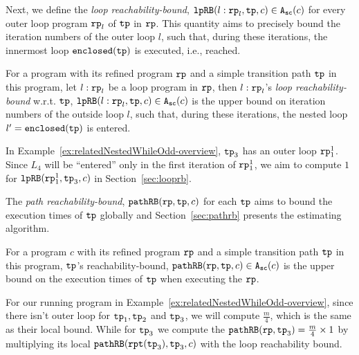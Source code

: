 Next, we define the \emph{loop reachability-bound},
$\mathtt{lpRB}(l: \mathtt{rp}_l, \mathtt{tp}, c) \in {\ensuremath{\mathtt{A_{sc}}}}(c)$ for every outer loop program $\mathtt{rp}_l$ of $\mathtt{tp}$ in $\mathtt{rp}$. This quantity aims to precisely bound the iteration numbers of the outer loop $l$,
such that,
during these iterations, the innermost loop $\mathtt{enclosed(\mathtt{tp})}$ is executed, i.e., reached.
\begin{defn}
For a program with its refined program $\mathtt{rp}$ and a simple transition path $\mathtt{tp}$ in this program, 
let $l: \mathtt{rp}_l$ be a loop program in $\mathtt{rp}$,
then $l: \mathtt{rp}_l$'s \emph{loop reachability-bound} w.r.t. $\mathtt{tp}$,  $\mathtt{lpRB}(l: \mathtt{rp}_l, \mathtt{tp}, c) \in {\ensuremath{\mathtt{A_{sc}}}}(c)$
is the upper bound on iteration numbers of the outside loop $l$,
such that,
during these iterations, the nested loop $l' = \mathtt{enclosed(\mathtt{tp})}$ is entered.
\end{defn}
In Example~\ref{ex:relatedNestedWhileOdd-overview}, $\mathtt{tp}_3$ has an outer loop $\mathtt{rp}_1^1$. Since $L_4$ will be ``entered'' only in the first iteration of $\mathtt{rp}_1^1$,
we aim to compute $1$ for $\mathtt{lpRB}(\mathtt{rp}_1^1, \mathtt{tp}_3, c)$ in Section~\ref{sec:looprb}.

The \emph{path reachability-bound}, $\mathtt{pathRB}(\mathtt{rp}, \mathtt{tp}, c)$ for each $\mathtt{tp}$
aims to bound the execution times of $\mathtt{tp}$ globally
and Section~\ref{sec:pathrb} presents the estimating algorithm.
%
\begin{defn}
For a program $c$ with its refined program $\mathtt{rp}$ and a simple transition path $\mathtt{tp}$ in this program, 
$\mathtt{tp}$'s reachability-bound, $\mathtt{pathRB}(\mathtt{rp}, \mathtt{tp}, c) \in {\ensuremath{\mathtt{A_{sc}}}}(c)$ is the upper bound on the
execution times of $\mathtt{tp}$ when executing the $\mathtt{rp}$.
\end{defn}

For our running program in Example~\ref{ex:relatedNestedWhileOdd-overview}, since there isn't outer loop for $\mathtt{tp}_1, \mathtt{tp}_2$ and $\mathtt{tp}_3$, we will compute $\frac{m}{4}$, which is the same as their local bound.
While for $\mathtt{tp}_3$ we compute  the $\mathtt{pathRB}(\mathtt{rp}, \mathtt{tp}_3) = \frac{m}{4} \times 1$ by multiplying its local $\mathtt{pathRB}(\mathtt{rpt}(\mathtt{tp}_3), \mathtt{tp}_3, c)$ with the loop reachability bound.

